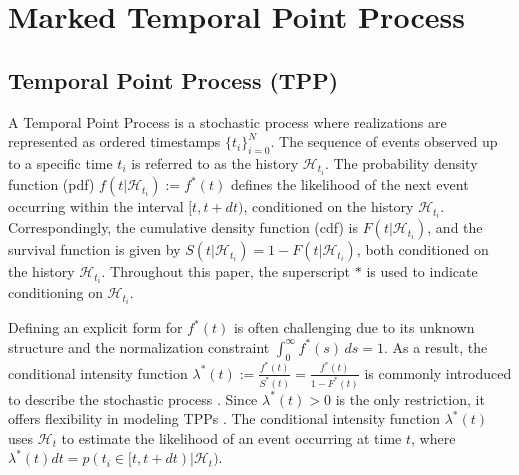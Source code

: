 \section{Marked Temporal Point Process}
\subsection{Temporal Point Process (TPP)}
A Temporal Point Process is a stochastic process where realizations are represented as ordered timestamps $\{t_i\}_{i=0}^N$. 
The sequence of events observed up to a specific time $t_i$ is referred to as the history $\mathcal{H}_{t_i}$. 
The probability density function (pdf) $f(t|\mathcal{H}_{t_i}) := f^*(t)$ defines the likelihood of the next event occurring within the interval $[t, t+dt)$, conditioned on the history $\mathcal{H}_{t_i}$. 
Correspondingly, the cumulative density function (cdf) is $F(t|\mathcal{H}_{t_i})$, and the survival function is given by $S(t|\mathcal{H}_{t_i}) = 1-F(t|\mathcal{H}_{t_i})$, both conditioned on the history $\mathcal{H}_{t_i}$.
Throughout this paper, the superscript $*$ is used to indicate conditioning on $\mathcal{H}_{t_i}$.

Defining an explicit form for $f^*(t)$ is often challenging due to its unknown structure and the normalization constraint $\int_0^\infty f^*(s) \, ds = 1$. 
As a result, the conditional intensity function $\lambda^*(t):= \frac{f^*(t)}{S^*(t)} = \frac{f^*(t)}{1-F^*(t)}$ is commonly introduced to describe the stochastic process \cite{lec:tpp}. 
Since $\lambda^*(t) > 0$ is the only restriction, it offers flexibility in modeling TPPs \cite{bib:hawkesOrigin, bib:nhp, bib:fully_neural, bib:NJSDE, bib:sahp, bib:THP, bib:STPP, bib:ANHP}. 
The conditional intensity function $\lambda^*(t)$ uses $\mathcal{H}_{t}$ to estimate the likelihood of an event occurring at time $t$, where $\lambda^*(t) dt = p(t_{i} \in [t, t+dt) | \mathcal{H}_{t})$.

